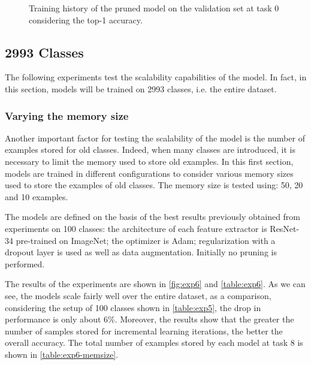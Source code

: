 \begin{figure}[H]
	\caption{Training history of the pruned model on the validation set at task 0 considering the top-1 accuracy.}%
	\label{fig:exp5-loss}%
\end{figure}


\subsection{2993 Classes}
\label{sec:whole_dataset_clf}

The following experiments test the scalability capabilities of the model. In fact, in this section, models will be trained on 2993 classes, i.e. the entire dataset.

\subsubsection{Varying the memory size}
Another important factor for testing the scalability of the model is the number of examples stored for old classes. 
Indeed, when many classes are introduced, it is necessary to limit the memory used to store old examples.
In this first section, models are trained in different configurations to consider various memory sizes used to store the examples of old classes.
The memory size is tested using: 50, 20 and 10 examples.

The models are defined on the basis of the best results previously obtained from experiments on 100 classes: the architecture of each feature extractor is ResNet-34 pre-trained on ImageNet; the optimizer is Adam; regularization with a dropout layer is used as well as data augmentation. Initially no pruning is performed.

The results of the experiments are shown in \autoref{fig:exp6} and \autoref{table:exp6}.
As we can see, the models scale fairly well over the entire dataset, as a comparison, considering the setup of 100 classes shown in \autoref{table:exp5}, the drop in performance is only about 6\%.%
Moreover, the results show that the greater the number of samples stored for incremental learning iterations, the better the overall accuracy.
The total number of examples stored by each model at task 8 is shown in \autoref{table:exp6-memsize}.

